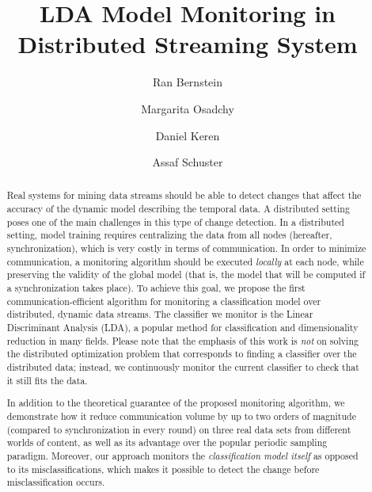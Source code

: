 \documentclass[sigconf]{acmart}
\begin{document}
\title{LDA Model Monitoring in Distributed Streaming System} 
\author{Ran Bernstein}
  
\author{Margarita Osadchy}

\author{Daniel Keren}

\author{Assaf Schuster}

\begin{abstract}
Real systems for mining data streams should be able to detect changes that affect the accuracy of the dynamic model describing the temporal data. A distributed setting poses one of the main challenges in this type of change detection. In a distributed setting, model training requires centralizing the data from all nodes (hereafter, synchronization), which is very costly in terms of communication. In order to minimize communication, a monitoring algorithm should be executed \emph{locally} at each node,
while preserving the validity of the global model (that is, the model that will be computed if a synchronization takes place). To achieve this goal, we propose the first communication-efficient algorithm for monitoring a classification model over distributed, dynamic data streams. The classifier we monitor is the Linear Discriminant Analysis (LDA), a popular method for classification and dimensionality reduction in many fields. Please note that the emphasis of this work is \emph{not} on solving the distributed optimization problem
that corresponds to finding a classifier over the distributed data; instead, we continuously
monitor the current classifier to check that it still fits the data.

In addition to the theoretical guarantee of the proposed monitoring algorithm, we demonstrate how it reduce communication volume by up to two orders of magnitude (compared to synchronization in every round) on three real data sets from different worlds of content, as well as its advantage over the
popular periodic sampling paradigm. Moreover, our approach monitors the \emph{classification model itself} as opposed to its misclassifications, which makes it possible to detect the change before misclassification occurs.
\end{abstract}
\end{document}

